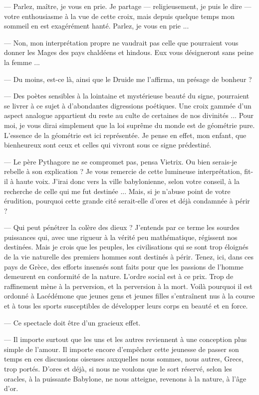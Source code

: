 \documentclass[a4paper, 11pt, oneside, polutonikogreek, french]{article}
\begin{document}
--- Parlez, maître, je vous en prie. Je partage --- religieusement, je puis le dire --- votre enthousiasme à la vue de cette croix, mais depuis quelque temps mon sommeil en est exagérément hanté. Parlez, je vous en prie ...

--- Non, mon interprétation propre ne vaudrait pas celle que pourraient vous donner les Mages des pays chaldéens et hindous. Eux vous désigneront sans peine la femme ...

--- Du moins, est-ce là, ainsi que le Druide me l'affirma, un présage de bonheur ?

--- Des poètes sensibles à la lointaine et mystérieuse beauté du signe, pourraient se livrer à ce sujet à d'abondantes digressions poétiques. Une croix gammée d'un aspect analogue appartient du reste au culte de certaines de nos divinités ... Pour moi, je vous dirai simplement que la loi suprême du monde est de géométrie pure. L'essence de la géométrie est ici représentée. Je pense en effet, mon enfant, que bienheureux sont ceux et celles qui vivront sous ce signe prédestiné.

\bigskip
\centerline{\EightStarTaper}
\centerline{\EightStarTaper\EightStarTaper}
\bigskip

--- Le père Pythagore ne se compromet pas, pensa Vietrix. Ou bien serais-je rebelle à son explication ? Je vous remercie de cette lumineuse interprétation, fit-il à haute voix. J'irai donc vers la ville babylonienne, selon votre conseil, à la recherche de celle qui me fut destinée ... Mais, si je n'abuse point de votre érudition, pourquoi cette grande cité serait-elle d'ores et déjà condamnée à périr ?

--- Qui peut pénétrer la colère des dieux ? J'entends par ce terme les sourdes puissances qui, avec une rigueur à la vérité peu mathématique, régissent nos destinées. Mais je crois que les peuples, les civilisations qui se sont trop éloignés de la vie naturelle des premiers hommes sont destinés à périr. Tenez, ici, dans ces pays de Grèce, des efforts insensés sont faits pour que les passions de l'homme demeurent en conformité de la nature. L'ordre social est à ce prix. Trop de raffinement mène à la perversion, et la perversion à la mort. Voilà pourquoi il est ordonné à Lacédémone que jeunes gens et jeunes filles s'entraînent nus à la course et à tous les sports susceptibles de développer leurs corps en beauté et en force.

--- Ce spectacle doit être d'un gracieux effet.

--- Il importe surtout que les uns et les autres reviennent à une conception plus simple de l'amour. Il importe encore d'empêcher cette jeunesse de passer son temps en ces discussions oiseuses auxquelles nous sommes, nous autres, Grecs, trop portés. D'ores et déjà, si nous ne voulons que le sort réservé, selon les oracles, à la puissante Babylone, ne nous atteigne, revenons à la nature, à l'âge d'or.
\end{document}
